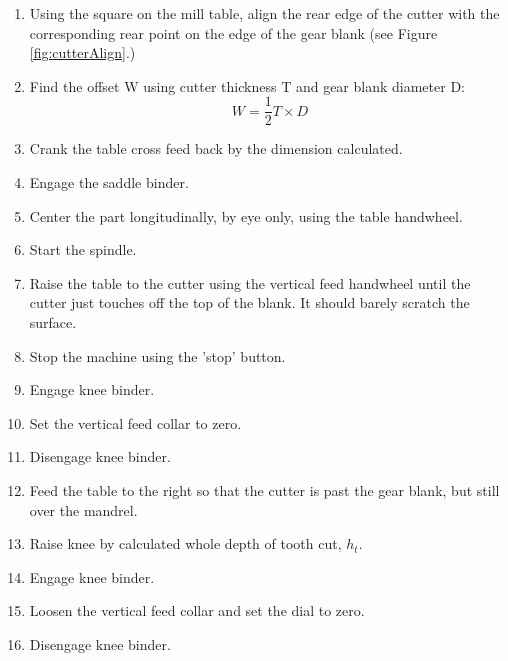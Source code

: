 \documentclass[12pt,twoside,letterpaper]{article}
\begin{document}
\begin{enumerate}
	\item Using the square on the mill table, align the rear edge of the cutter with the corresponding rear point on the edge of the gear blank (see Figure \ref{fig:cutterAlign}.)
\item Find the offset W using cutter thickness T and gear blank diameter D: \[ W = \frac{1}{2} T \times D\]
\item Crank the table cross feed back by the dimension calculated.
\item Engage the saddle binder.
\item Center the part longitudinally, by eye only, using the table handwheel.
\item Start the spindle.
\item Raise the table to the cutter using the vertical feed handwheel until the cutter just touches off the top of the blank. It should barely scratch the surface. 
\item Stop the machine using the 'stop' button.
\item Engage knee binder.
\item Set the vertical feed collar to zero.
\item Disengage knee binder.
\item Feed the table to the right so that the cutter is past the gear blank, but still over the mandrel.
\item Raise knee by calculated whole depth of tooth cut, $h_t$. 
\item Engage knee binder.
\item Loosen the vertical feed collar and set the dial to zero. 
\item Disengage knee binder.

\end{enumerate}
\end{document}
